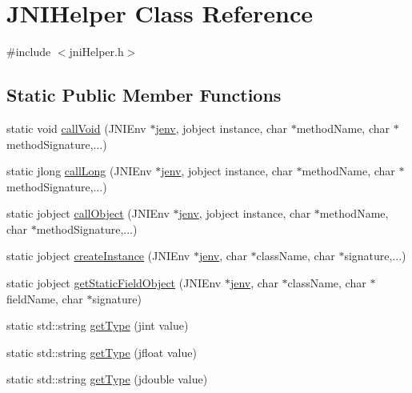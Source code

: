 \hypertarget{class_j_n_i_helper}{\section{J\-N\-I\-Helper Class Reference}
\label{class_j_n_i_helper}
}


{\ttfamily \#include $<$jni\-Helper.\-h$>$}

\subsection*{Static Public Member Functions}
\begin{DoxyCompactItemize}
\item 
static void \hyperlink{class_j_n_i_helper_adff29cbca25d5f6787f675afcdc38871}{call\-Void} (J\-N\-I\-Env $\ast$\hyperlink{aparapi_8cpp_a31595c73e9a3750524b2ff61b5a14f96}{jenv}, jobject instance, char $\ast$method\-Name, char $\ast$method\-Signature,...)
\item 
static jlong \hyperlink{class_j_n_i_helper_a0c2378b0f3447af66038ae9f6dea1000}{call\-Long} (J\-N\-I\-Env $\ast$\hyperlink{aparapi_8cpp_a31595c73e9a3750524b2ff61b5a14f96}{jenv}, jobject instance, char $\ast$method\-Name, char $\ast$method\-Signature,...)
\item 
static jobject \hyperlink{class_j_n_i_helper_ac6fc439bd0a306c475cc1392ff586951}{call\-Object} (J\-N\-I\-Env $\ast$\hyperlink{aparapi_8cpp_a31595c73e9a3750524b2ff61b5a14f96}{jenv}, jobject instance, char $\ast$method\-Name, char $\ast$method\-Signature,...)
\item 
static jobject \hyperlink{class_j_n_i_helper_a6d0240a89937c774bd5229944a54a544}{create\-Instance} (J\-N\-I\-Env $\ast$\hyperlink{aparapi_8cpp_a31595c73e9a3750524b2ff61b5a14f96}{jenv}, char $\ast$class\-Name, char $\ast$signature,...)
\item 
static jobject \hyperlink{class_j_n_i_helper_a62620661bbb5a7eb1c38cedccb2d9066}{get\-Static\-Field\-Object} (J\-N\-I\-Env $\ast$\hyperlink{aparapi_8cpp_a31595c73e9a3750524b2ff61b5a14f96}{jenv}, char $\ast$class\-Name, char $\ast$field\-Name, char $\ast$signature)
\item 
static std\-::string \hyperlink{class_j_n_i_helper_a6934bf9b61e058225184032cfc49bf08}{get\-Type} (jint value)
\item 
static std\-::string \hyperlink{class_j_n_i_helper_a3d4a3261b07e28a398bd99d59deb4160}{get\-Type} (jfloat value)
\item 
static std\-::string \hyperlink{class_j_n_i_helper_ad781e04f8719bcfa2a33868867a2a4b5}{get\-Type} (jdouble value)

\end{DoxyCompactItemize}
